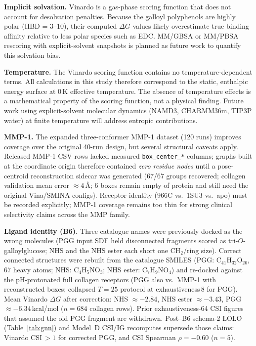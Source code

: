 \documentclass[11pt]{article}
\begin{document}
\textbf{Implicit solvation.}
Vinardo is a gas-phase scoring function that does not account for
desolvation penalties.  Because the galloyl polyphenols are highly polar
(HBD = 3--10), their computed $\Delta G$ values likely overestimate true
binding affinity relative to less polar species such as EDC.  MM/GBSA or
MM/PBSA rescoring with explicit-solvent snapshots is planned as future
work to quantify this solvation bias.

\textbf{Temperature.}  The Vinardo scoring function contains no
temperature-dependent terms.  All calculations in this study therefore
correspond to the static, enthalpic energy surface at 0\,K effective
temperature.  The absence of temperature effects is a mathematical property of
the scoring function, not a physical finding.  Future work using
explicit-solvent molecular dynamics (NAMD3, CHARMM36m, TIP3P water) at finite
temperature will address entropic contributions.

\textbf{MMP-1.}  The expanded three-conformer MMP-1 dataset (120 runs)
improves coverage over the original 40-run design, but several structural
caveats apply.
Released MMP-1 CSV rows lacked measured \texttt{box\_center\_*} columns;
graphs built at the coordinate origin therefore contained
\emph{zero residue nodes} until a pose-centroid reconstruction sidecar
was generated (67/67 groups recovered; collagen validation mean error
$\approx 4$\,\AA; 6 boxes remain empty of protein and still need the
original Vina/SMINA configs).
Receptor identity (966C vs.\ 1SU3 vs.\ apo) must be recorded explicitly;
MMP-1 coverage remains too thin for strong clinical selectivity claims
across the MMP family.

\textbf{Ligand identity (B6).}
Three catalogue names were previously docked as the wrong molecules
(PGG input SDF held disconnected fragments scored as tri-$O$-galloylglucose;
NHS and the NHS ester each short one CH$_2$/ring size).
Correct connected structures were rebuilt from the catalogue SMILES
(PGG: C$_{41}$H$_{32}$O$_{26}$, 67 heavy atoms; NHS: C$_4$H$_5$NO$_3$;
NHS ester: C$_7$H$_9$NO$_4$) and re-docked against the pH-protonated
full collagen receptors (PGG also vs.\ MMP-1 with reconstructed boxes;
collapsed $T{=}25$ protocol at exhaustiveness\,8 for PGG).
Mean Vinardo $\Delta G$ after correction:
NHS $\approx -2.84$, NHS ester $\approx -3.43$,
PGG $\approx -6.34$\,kcal/mol ($n{=}684$ collagen rows).
Prior exhaustiveness-64 CSI figures that assumed the old PGG fragment are
withdrawn.
Post--B6 schema-2 LOLO (Table~\ref{tab:gnn}) and Model~D CSI/IG
recomputes supersede those claims: Vinardo CSI\,$> 1$ for corrected PGG,
and CSI Spearman $\rho = -0.60$ ($n{=}5$).
\end{document}
